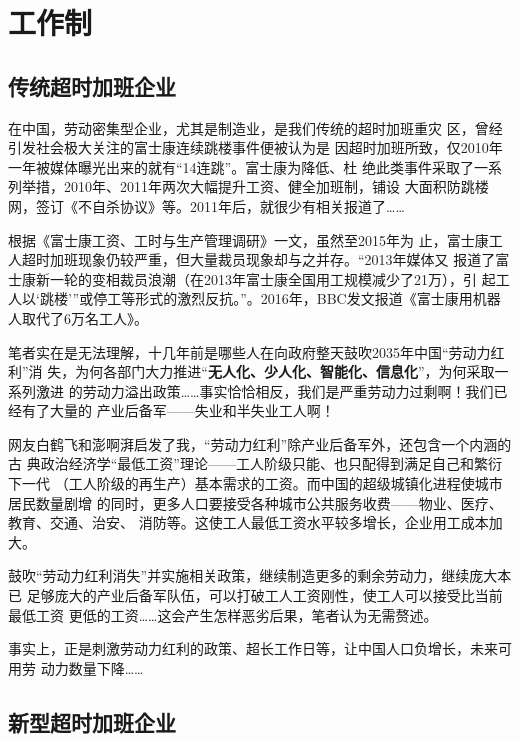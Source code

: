 \chapter{工作制}

\section{传统超时加班企业}

在中国，劳动密集型企业，尤其是制造业，是我们传统的超时加班重灾
区\cite{guojilaogongshijian}，曾经引发社会极大关注的富士康连续跳楼事件便被认为是
因超时加班所致，仅2010年一年被媒体曝光出来的就有“14连跳”。富士康为降低、杜
绝此类事件采取了一系列举措，2010年、2011年两次大幅提升工资、健全加班制，铺设
大面积防跳楼网，签订《不自杀协议》等。2011年后，就很少有相关报道了……

根据《富士康工资、工时与生产管理调研》\cite{fushikangzuixin}一文，虽然至2015年为
止，富士康工人超时加班现象仍较严重，但大量裁员现象却与之并存。“2013年媒体又
报道了富士康新一轮的变相裁员浪潮（在2013年富士康全国用工规模减少了21万），引
起工人以`跳楼'”或停工等形式的激烈反抗。”。2016年，BBC发文报道《富士康用机器
人取代了6万名工人》。

笔者实在是无法理解，十几年前是哪些人在向政府整天鼓吹2035年中国“劳动力红利”消
失，为何各部门大力推进“\textbf{无人化、少人化、智能化、信息化}”，为何采取一系列激进
的劳动力溢出政策……事实恰恰相反，我们是严重劳动力过剩啊！我们已经有了大量的
产业后备军——失业和半失业工人啊！

网友白鹤飞和澎啊湃启发了我，“劳动力红利”除产业后备军外，还包含一个内涵的古
典政治经济学“最低工资”理论——工人阶级只能、也只配得到满足自己和繁衍下一代
（工人阶级的再生产）基本需求的工资。而中国的超级城镇化进程使城市居民数量剧增
的同时，更多人口要接受各种城市公共服务收费——物业、医疗、教育、交通、治安、
消防等。这使工人最低工资水平较多增长，企业用工成本加大。

鼓吹“劳动力红利消失”并实施相关政策，继续制造更多的剩余劳动力，继续庞大本已
足够庞大的产业后备军队伍，可以打破工人工资刚性，使工人可以接受比当前最低工资
更低的工资……这会产生怎样恶劣后果，笔者认为无需赘述。

事实上，正是刺激劳动力红利的政策、超长工作日等，让中国人口负增长，未来可用劳
动力数量下降……



\section{新型超时加班企业}

